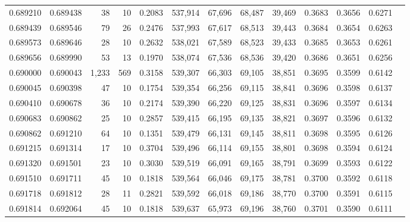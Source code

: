 \begin{tabular}{rrrrrrrrrrrrr}
0.689210 & 0.689438 &    38 &  10 &                                     0.2083 & 537,914 &  67,696 &  68,487 &  39,469 & 0.3683 & 0.3656 & 0.6271 \\
0.689439 & 0.689546 &    79 &  26 &                                     0.2476 & 537,993 &  67,617 &  68,513 &  39,443 & 0.3684 & 0.3654 & 0.6263 \\
0.689573 & 0.689646 &    28 &  10 &                                     0.2632 & 538,021 &  67,589 &  68,523 &  39,433 & 0.3685 & 0.3653 & 0.6261 \\
0.689656 & 0.689990 &    53 &  13 &                                     0.1970 & 538,074 &  67,536 &  68,536 &  39,420 & 0.3686 & 0.3651 & 0.6256 \\
0.690000 & 0.690043 & 1,233 & 569 &                                     0.3158 & 539,307 &  66,303 &  69,105 &  38,851 & 0.3695 & 0.3599 & 0.6142 \\
0.690045 & 0.690398 &    47 &  10 &                                     0.1754 & 539,354 &  66,256 &  69,115 &  38,841 & 0.3696 & 0.3598 & 0.6137 \\
0.690410 & 0.690678 &    36 &  10 &                                     0.2174 & 539,390 &  66,220 &  69,125 &  38,831 & 0.3696 & 0.3597 & 0.6134 \\
0.690683 & 0.690862 &    25 &  10 &                                     0.2857 & 539,415 &  66,195 &  69,135 &  38,821 & 0.3697 & 0.3596 & 0.6132 \\
0.690862 & 0.691210 &    64 &  10 &                                     0.1351 & 539,479 &  66,131 &  69,145 &  38,811 & 0.3698 & 0.3595 & 0.6126 \\
0.691215 & 0.691314 &    17 &  10 &                                     0.3704 & 539,496 &  66,114 &  69,155 &  38,801 & 0.3698 & 0.3594 & 0.6124 \\
0.691320 & 0.691501 &    23 &  10 &                                     0.3030 & 539,519 &  66,091 &  69,165 &  38,791 & 0.3699 & 0.3593 & 0.6122 \\
0.691510 & 0.691711 &    45 &  10 &                                     0.1818 & 539,564 &  66,046 &  69,175 &  38,781 & 0.3700 & 0.3592 & 0.6118 \\
0.691718 & 0.691812 &    28 &  11 &                                     0.2821 & 539,592 &  66,018 &  69,186 &  38,770 & 0.3700 & 0.3591 & 0.6115 \\
0.691814 & 0.692064 &    45 &  10 &                                     0.1818 & 539,637 &  65,973 &  69,196 &  38,760 & 0.3701 & 0.3590 & 0.6111 \\

\end{tabular}
